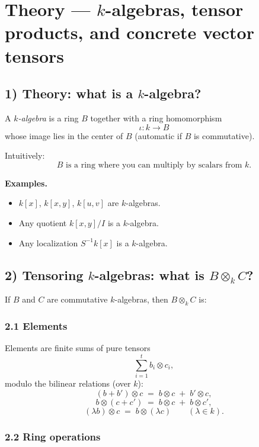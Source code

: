 \documentclass[12pt,a4paper]{article}
\theoremstyle{plain}
\theoremstyle{definition}      %
\begin{document}
	\section*{Theory — \(k\)-algebras, tensor products, and concrete vector tensors}
	
	\subsection*{1) Theory: what is a \(k\)-algebra?}
	
	A \emph{\(k\)-algebra} is a ring \(B\) together with a ring homomorphism
	\[
	\iota: k \longrightarrow B
	\]
	whose image lies in the center of \(B\) (automatic if \(B\) is commutative).
	
	Intuitively:
	\[
	B \text{ is a ring where you can multiply by scalars from } k.
	\]
	
	\medskip
	\textbf{Examples.}
	\begin{itemize}
		\item \(k[x]\), \(k[x,y]\), \(k[u,v]\) are \(k\)-algebras.
		\item Any quotient \(k[x,y]/I\) is a \(k\)-algebra.
		\item Any localization \(S^{-1}k[x]\) is a \(k\)-algebra.
	\end{itemize}
	
	\subsection*{2) Tensoring \(k\)-algebras: what is \(B\otimes_k C\)?}
	
	If \(B\) and \(C\) are commutative \(k\)-algebras, then \(B\otimes_k C\) is:
	
	\subsubsection*{2.1 Elements}
	
	Elements are finite sums of pure tensors
	\[
	\sum_{i=1}^{t} b_i\otimes c_i,
	\]
	modulo the bilinear relations (over \(k\)):
	\[
	(b+b')\otimes c \;=\; b\otimes c \;+\; b'\otimes c,
	\]
	\[
	b\otimes (c+c') \;=\; b\otimes c \;+\; b\otimes c',
	\]
	\[
	(\lambda b)\otimes c \;=\; b\otimes (\lambda c)
	\qquad (\lambda\in k).
	\]
	
	\subsubsection*{2.2 Ring operations}
	
\end{document}
